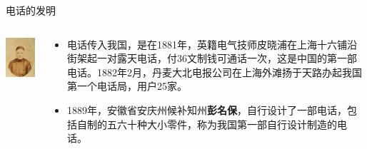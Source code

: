 \documentclass{beamer}
\begin{document}
\begin{frame}{电话的发明}
  \begin{columns}
    \begin{column}{0.35\linewidth}
      \includegraphics[width=3.5cm]{pengmingbao}
    \end{column}
    \begin{column}{0.65\linewidth}
      \begin{itemize}
        \item 电话传入我国，是在1881年，英籍电气技师皮晓浦在上海十六铺沿街架起一对露天电话，付36文制钱可通话一次，这是中国的第一部电话。1882年2月，丹麦大北电报公司在上海外滩扬于天路办起我国第一个电话局，用户25家。
        \item 1889年，安徽省安庆州候补知州\textbf{彭名保}，自行设计了一部电话，包括自制的五六十种大小零件，称为我国第一部自行设计制造的电话。
      \end{itemize}
    \end{column}
  \end{columns}
\end{frame}
\end{document}
